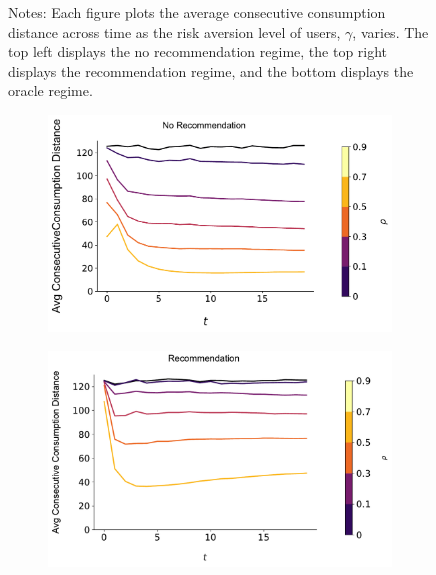 \documentclass[format=acmsmall, review=true]{acmart}
\begin{document}
\begin{figure}[H]
\begin{subfigure}{.45\textwidth}
\end{subfigure}%
\caption*{\scriptsize Notes: Each figure plots the average consecutive consumption distance across time as the risk aversion level of users, $\gamma$, varies. The top left displays the no recommendation regime, the top right displays the recommendation regime, and the bottom displays the oracle regime.}
\label{fig:no_rec_risk_aversion}
\end{figure}

\addtocounter{figure}{-1}

\begin{figure}[H]
\caption{Relationship between Local Consumption and $\rho$, $N = 500$}
\begin{subfigure}{.45\textwidth}
\includegraphics[width=\linewidth]{figures/rho_consumption_dist_N_500T_20.pdf}
\end{subfigure}
\begin{subfigure}{.45\textwidth}
\includegraphics[width=\linewidth]{figures/rho_consumption_dist_N_500T_20_partial.pdf}

\end{subfigure}
\end{figure}
\end{document}
